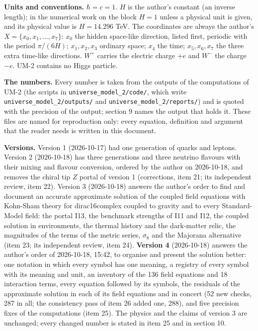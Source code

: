 \documentclass[
  10pt,
]{article}
\begin{document}
\textbf{Units and conventions.} \(\hbar = c = 1\). \(H\) is the author's
constant (an inverse length); in the numerical work on the block
\(H = 1\) unless a physical unit is given, and its physical value is
\(H = 14.296\) TeV. The coordinates are always the author's
\(X = \{x_0, x_1, \dots, x_7\}\): \(x_0\) the hidden space-like
direction, listed first, periodic with the period \(\pi/(6H)\);
\(x_1, x_2, x_3\) ordinary space; \(x_4\) the time; \(x_5, x_6, x_7\)
the three extra time-like directions. \(W^+\) carries the electric
charge \(+e\) and \(W^-\) the charge \(-e\). UM-2 contains no Higgs
particle.

\textbf{The numbers.} Every number is taken from the outputs of the
computations of UM-2 (the scripts in \texttt{universe\_model\_2/code/},
which write \texttt{universe\_model\_2/outputs/} and
\texttt{universe\_model\_2/reports/}) and is quoted with the precision
of the output; section 9 names the output that holds it. These files are
named for reproduction only: every equation, definition and argument
that the reader needs is written in this document.

\textbf{Versions.} Version 1 (2026-10-17) had one generation of quarks
and leptons. Version 2 (2026-10-18) has three generations and three
neutrino flavours with their mixing and flavour conversion, ordered by
the author on 2026-10-18, and removes the chiral tip \(Z\) portal of
version 1 (corrections, item 21; its independent review, item 22).
Version 3 (2026-10-18) answers the author's order to find and document
an accurate approximate solution of the coupled field equations with
Kohn-Sham theory for dirac16complex coupled to gravity and to every
Standard-Model field: the portal I13, the benchmark strengths of I11 and
I12, the coupled solution in environments, the thermal history and the
dark-matter relic, the magnitudes of the terms of the metric series,
\(\sigma_8\) and the Majorana alternative (item 23; its independent
review, item 24). \textbf{Version 4} (2026-10-18) answers the author's
order of 2026-10-18, 15:42, to organise and present the solution better:
one notation in which every symbol has one meaning, a registry of every
symbol with its meaning and unit, an inventory of the 136 field
equations and 18 interaction terms, every equation followed by its
symbols, the residuals of the approximate solution in each of its field
equations and in concert (52 new checks, 287 in all; the consistency
pass of item 26 added one, 288), and five precision fixes of the
computations (item 25). The physics and the claims of version 3 are
unchanged; every changed number is stated in item 25 and in section 10.
\end{document}
